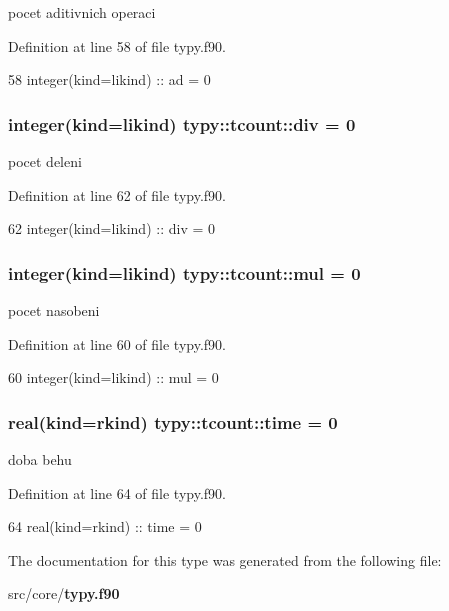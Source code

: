 pocet aditivnich operaci 



Definition at line 58 of file typy.\+f90.


\begin{DoxyCode}
58         \textcolor{keywordtype}{integer(kind=likind)} :: ad = 0
\end{DoxyCode}
\subsubsection[{div}]{\setlength{\rightskip}{0pt plus 5cm}integer(kind={\bf likind}) typy\+::tcount\+::div = 0}\label{structtypy_1_1tcount_a56f7ee9e379fb0657fc6729ae0e8eedc}


pocet deleni 



Definition at line 62 of file typy.\+f90.


\begin{DoxyCode}
62         \textcolor{keywordtype}{integer(kind=likind)} :: div = 0
\end{DoxyCode}
\subsubsection[{mul}]{\setlength{\rightskip}{0pt plus 5cm}integer(kind={\bf likind}) typy\+::tcount\+::mul = 0}\label{structtypy_1_1tcount_acb3e84ceaddd7603add14a6a634be6ed}


pocet nasobeni 



Definition at line 60 of file typy.\+f90.


\begin{DoxyCode}
60         \textcolor{keywordtype}{integer(kind=likind)} :: mul = 0
\end{DoxyCode}
\subsubsection[{time}]{\setlength{\rightskip}{0pt plus 5cm}real(kind={\bf rkind}) typy\+::tcount\+::time = 0}\label{structtypy_1_1tcount_a39ec51004274c0e7e2cd7142aa55cfcd}


doba behu 



Definition at line 64 of file typy.\+f90.


\begin{DoxyCode}
64         \textcolor{keywordtype}{real(kind=rkind)} :: time = 0
\end{DoxyCode}


The documentation for this type was generated from the following file\+:\begin{DoxyCompactItemize}
\item 
src/core/{\bf typy.\+f90}\end{DoxyCompactItemize}
